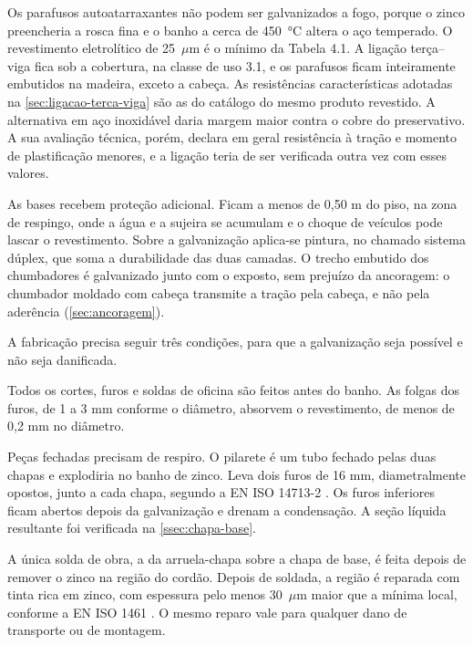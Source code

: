 Os parafusos autoatarraxantes não podem ser galvanizados a fogo, porque o zinco
preencheria a rosca fina e o banho a cerca de 450~°C altera o aço temperado. O
revestimento eletrolítico de 25~$\mu$m é o mínimo da Tabela 4.1. A ligação
terça--viga fica sob a cobertura, na classe de uso 3.1, e os parafusos ficam
inteiramente embutidos na madeira, exceto a cabeça. As resistências
características adotadas na \autoref{sec:ligacao-terca-viga} são as do catálogo
do mesmo produto revestido. A alternativa em aço inoxidável daria margem maior
contra o cobre do preservativo. A sua avaliação técnica, porém, declara em geral
resistência à tração e momento de plastificação menores, e a ligação teria de
ser verificada outra vez com esses valores.

As bases recebem proteção adicional. Ficam a menos de 0,50 m do piso, na zona
de respingo, onde a água e a sujeira se acumulam e o choque de veículos pode
lascar o revestimento. Sobre a galvanização aplica-se pintura, no chamado
sistema dúplex, que soma a durabilidade das duas camadas. O trecho embutido dos
chumbadores é galvanizado junto com o exposto, sem prejuízo da ancoragem: o
chumbador moldado com cabeça transmite a tração pela cabeça, e não pela
aderência (\autoref{sec:ancoragem}).

A fabricação precisa seguir três condições, para que a galvanização seja
possível e não seja danificada.
\begin{alineas}
    \item Todos os cortes, furos e soldas de oficina são feitos antes do banho.
          As folgas dos furos, de 1 a 3 mm conforme o diâmetro, absorvem o
          revestimento, de menos de 0,2 mm no diâmetro.
    \item Peças fechadas precisam de respiro. O pilarete é um tubo fechado pelas
          duas chapas e explodiria no banho de zinco. Leva dois furos de 16 mm,
          diametralmente opostos, junto a cada chapa, segundo a EN ISO 14713-2
          \cite{ENISO14713-2:2019}. Os furos inferiores ficam abertos depois da
          galvanização e drenam a condensação. A seção líquida resultante foi
          verificada na \autoref{ssec:chapa-base}.
    \item A única solda de obra, a da arruela-chapa sobre a chapa de base, é
          feita depois de remover o zinco na região do cordão. Depois de soldada,
          a região é reparada com tinta rica em zinco, com espessura pelo menos
          30~$\mu$m maior que a mínima local, conforme a EN ISO 1461
          \cite{ENISO1461:2022}. O mesmo reparo vale para qualquer dano de
          transporte ou de montagem.
\end{alineas}

